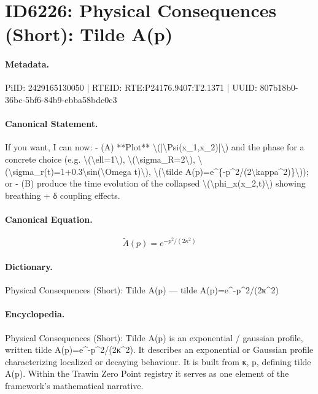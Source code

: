 \section*{ID6226: Physical Consequences (Short): Tilde A(p)}
\paragraph{Metadata.}
PiID: 2429165130050 | RTEID: RTE:P24176.9407:T2.1371 | UUID: 807b18b0-36bc-5bf6-84b9-ebba58bdc0c3

\paragraph{Canonical Statement.}
If you want, I can now: - (A) **Plot** \textbackslash{}(|\textbackslash{}Psi(x\_1,x\_2)|\textbackslash{}) and the phase for a concrete choice (e.g. \textbackslash{}(\textbackslash{}ell=1\textbackslash{}), \textbackslash{}(\textbackslash{}sigma\_R=2\textbackslash{}), \textbackslash{}(\textbackslash{}sigma\_r(t)=1+0.3\textbackslash{}sin(\textbackslash{}Omega t)\textbackslash{}), \textbackslash{}(\textbackslash{}tilde A(p)=e\textasciicircum{}\{-p\textasciicircum{}2/(2\textbackslash{}kappa\textasciicircum{}2)\}\textbackslash{})); or - (B) produce the time evolution of the collapsed \textbackslash{}(\textbackslash{}phi\_x(x\_2,t)\textbackslash{}) showing breathing + δ coupling effects.

\paragraph{Canonical Equation.}
\[
\tilde A(p)=e^{-p^2/(2\kappa^2)}
\]

\paragraph{Dictionary.}
Physical Consequences (Short): Tilde A(p) — tilde A(p)=e\textasciicircum{}-p\textasciicircum{}2/(2κ\textasciicircum{}2)

\paragraph{Encyclopedia.}
Physical Consequences (Short): Tilde A(p) is an exponential / gaussian profile, written tilde A(p)=e\textasciicircum{}-p\textasciicircum{}2/(2κ\textasciicircum{}2). It describes an exponential or Gaussian profile characterizing localized or decaying behaviour. It is built from κ, p, defining tilde A(p). Within the Trawin Zero Point registry it serves as one element of the framework's mathematical narrative.
